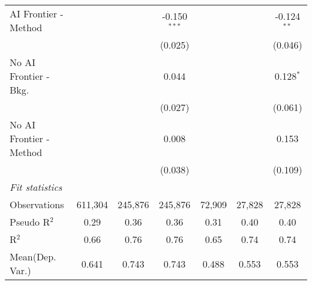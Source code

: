 \begin{tabular}{lcccccc}
   AI Frontier - Method    &                &                & -0.150$^{***}$ &                &                & -0.124$^{**}$\\   
                           &                &                & (0.025)        &                &                & (0.046)\\   
   No AI Frontier - Bkg.   &                &                & 0.044          &                &                & 0.128$^{*}$\\   
                           &                &                & (0.027)        &                &                & (0.061)\\   
   No AI Frontier - Method &                &                & 0.008          &                &                & 0.153\\   
                           &                &                & (0.038)        &                &                & (0.109)\\   
   \midrule
   \emph{Fit statistics}\\
   Observations            & 611,304        & 245,876        & 245,876        & 72,909         & 27,828         & 27,828\\  
   Pseudo R$^2$            & 0.29           & 0.36           & 0.36           & 0.31           & 0.40           & 0.40\\  
   R$^2$                   & 0.66           & 0.76           & 0.76           & 0.65           & 0.74           & 0.74\\  
Mean(Dep. Var.) & 0.641 & 0.743 & 0.743 & 0.488 & 0.553 & 0.553 \\
   

\end{tabular}
